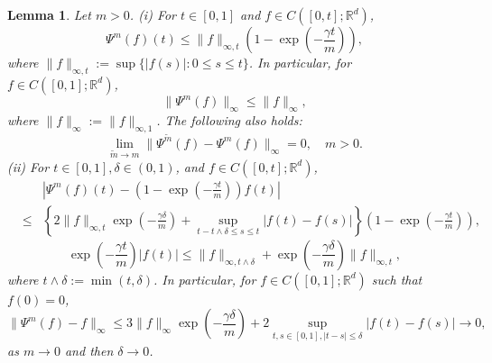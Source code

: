 \documentclass[12pt]{article}
\newtheorem{lemma}{Lemma}[section]
\begin{document}
\begin{lemma}\label{lm3.1}
Let $m>0$.
(i) For $t\in [0,1]$ and $f\in C([0,t];\mathbb{R}^d)$,
\begin{equation}\label{3.1}
\Psi^{m} (f)(t)\le \|f\|_{\infty,t}\left(1- \exp\left (-\frac{\gamma t}{m} \right) \right),
\end{equation}
where $\|f\|_{\infty,t}:=\sup\{|f(s)|:0\le s\le t\}$.
In particular, for  $f\in C([0,1];\mathbb{R}^d)$,
\begin{equation}\label{3.2}
\|\Psi^{m} (f)\|_{\infty}\le \|f\|_{\infty},
\end{equation}
where $\|f\|_{\infty}:=\|f\|_{\infty,1}$. The following also holds:
\begin{equation}\label{3.3.0}
\lim_{\tilde m\to m}\|\Psi^{\tilde m} (f)-\Psi^{m} (f)\|_{\infty}=0, \quad m>0.
\end{equation}
(ii) For $t\in [0,1], \delta\in (0,1)$,  and $f\in C([0,t];\mathbb{R}^d)$, 
\begin{eqnarray}\label{3.3}
&&\left|\Psi^{m} (f)(t)-\left(1-\exp\left (-\frac{\gamma t}{m} \right)\right)f(t)\right|\\
& \le& \left\{2\|f\|_{\infty,t}\exp\left (-\frac{\gamma \delta}{m} \right)
+\sup_{t-t\wedge\delta\le s\le t}|f(t)-f(s)|\right\}\left(1-\exp\left (-\frac{\gamma t}{m} \right)\right),\nonumber
\end{eqnarray}
\begin{equation}\label{3.4.0}
\exp\left (-\frac{\gamma t}{m} \right)|f(t)|\le \|f\|_{\infty,t\wedge\delta}+\exp\left (-\frac{\gamma \delta}{m} \right)\|f\|_{\infty,t},
\end{equation}
where $t\wedge\delta:=\min (t,\delta )$.
In particular, for $f\in C([0,1];\mathbb{R}^d)$ such that $f(0)=0$,
\begin{equation}\label{3.4}
\|\Psi^{m} (f)-f\|_{\infty}\le 3\|f\|_{\infty}\exp\left (-\frac{\gamma \delta}{m} \right)
+2\sup_{t,s\in [0,1], |t-s|\le\delta}|f(t)-f(s)|\to 0,
\end{equation}
as $m\to 0$ and then $\delta \to 0$.

\end{lemma}
\end{document}
